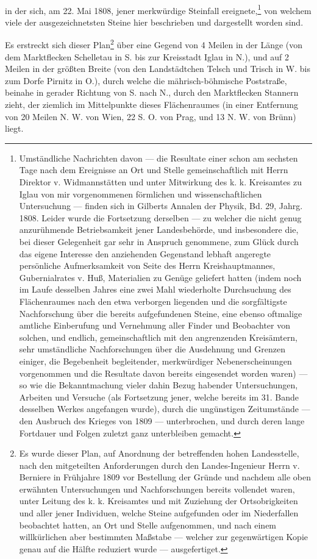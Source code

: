 \documentclass[a4paper, 11pt, oneside, german]{article}
\begin{document}
\paragraph{}
in der sich, am 22. Mai 1808, jener merkwürdige Steinfall ereignete,\footnote{Umständliche Nachrichten davon --- die Resultate einer schon am sechsten Tage nach dem Ereignisse an Ort und Stelle gemeinschaftlich mit Herrn Direktor v. Widmannstätten und unter Mitwirkung des k. k. Kreisamtes zu Iglau von mir vorgenommenen förmlichen und wissenschaftlichen Untersuchung --- finden sich in Gilberts Annalen der Physik, Bd. 29, Jahrg. 1808. Leider wurde die Fortsetzung derselben --- zu welcher die nicht genug anzurühmende Betriebsamkeit jener Landesbehörde, und insbesondere die, bei dieser Gelegenheit gar sehr in Anspruch genommene, zum Glück durch das eigene Interesse den anziehenden Gegenstand lebhaft angeregte persönliche Aufmerksamkeit von Seite des Herrn Kreishauptmannes, Gubernialrates v. Huß, Materialien zu Genüge geliefert hatten (indem noch im Laufe desselben Jahres eine zwei Mahl wiederholte Durchsuchung des Flächenraumes nach den etwa verborgen liegenden und die sorgfältigste Nachforschung über die bereits aufgefundenen Steine, eine ebenso oftmalige amtliche Einberufung und Vernehmung aller Finder und Beobachter von solchen, und endlich, gemeinschaftlich mit den angrenzenden Kreisämtern, sehr umständliche Nachforschungen über die Ausdehnung und Grenzen einiger, die Begebenheit begleitender, merkwürdiger Nebenerscheinungen vorgenommen und die Resultate davon bereits eingesendet worden waren) --- so wie die Bekanntmachung vieler dahin Bezug habender Untersuchungen, Arbeiten und Versuche (als Fortsetzung jener, welche bereits im 31. Bande desselben Werkes angefangen wurde), durch die ungünstigen Zeitumstände --- den Ausbruch des Krieges von 1809 --- unterbrochen, und durch deren lange Fortdauer und Folgen zuletzt ganz unterbleiben gemacht.} von welchem viele der ausgezeichnetsten Steine hier beschrieben und dargestellt worden sind.

Es erstreckt sich dieser Plan\footnote{Es wurde dieser Plan, auf Anordnung der betreffenden hohen Landesstelle, nach den mitgeteilten Anforderungen durch den Landes-Ingenieur Herrn v. Berniere in Frühjahre 1809 vor Bestellung der Gründe und nachdem alle oben erwähnten Untersuchungen und Nachforschungen bereits vollendet waren, unter Leitung des k. k. Kreisamtes und mit Zuziehung der Ortsobrigkeiten und aller jener Individuen, welche Steine aufgefunden oder im Niederfallen beobachtet hatten, an Ort und Stelle aufgenommen, und nach einem willkürlichen aber bestimmten Maßstabe --- welcher zur gegenwärtigen Kopie genau auf die Hälfte reduziert wurde --- ausgefertiget.} über eine Gegend von 4 Meilen in der Länge (von dem Marktflecken Schelletau in S. bis zur Kreisstadt Iglau in N.), und auf 2 Meilen in der größten Breite (von den Landstädtchen Telsch und Trisch in W. bis zum Dorfe Pirnitz in O.), durch welche die mährisch-böhmische Poststraße, beinahe in gerader Richtung von S. nach N., durch den Marktflecken Stannern zieht, der ziemlich im Mittelpunkte dieses Flächenraumes (in einer Entfernung von 20 Meilen N. W. von Wien, 22 S. O. von Prag, und 13 N. W. von Brünn) liegt.
\end{document}
